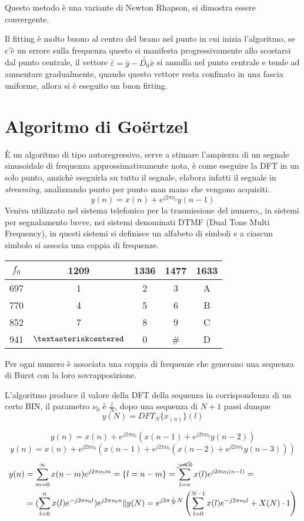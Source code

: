 Questo metodo è una variante di Newton Rhapson, si dimostra essere convergente.



Il fitting è molto buono al centro del brano nel punto in cui inizia
l'algoritmo, se c'è un errore sulla frequenza questo si manifesta
progressivamente allo scostarsi dal punto centrale, il vettore
$\bar{\varepsilon} = \bar{y} - \bar{\bar{D_0}}\bar{x}$ si annulla nel punto
centrale e tende ad aumentare gradualmente, quando questo vettore resta
confinato in una fascia uniforme, allora si è eseguito un buon fitting.

\section{Algoritmo di Goërtzel}
È un algoritmo di tipo autoregressivo, serve a stimare l'ampiezza di un segnale
sinusoidale di frequenza approssimativamente nota, è come eseguire la DFT in un
solo punto, anzichè eseguirla su tutto il segnale, elabora infatti il segnale
in \textit{streaming}, analizzando punto per punto man mano che vengono
acquisiti.
$$
y(n) = x(n) + e^{j2\pi \nu_0} y(n-1)
$$
Veniva utilizzato nel sistema telefonico per la trasmissione del numero,, in
sistemi per segnalamento breve, nei sistemi denominati DTMF (Dual Tone Multi
Frequency), in questi sistemi si definisce un alfabeto di simboli e a ciascun
simbolo si associa una coppia di frequenze.
\begin{table}[h]\centering
\begin{tabular}{c | c | c| c| c}
 $f_0$ &1209 &1336 & 1477 &1633 \\ \hline
 697 & 1 & 2 & 3 & A \\ \hline
 770 & 4 & 5 & 6 & B \\ \hline
 852 & 7 & 8 & 9 & C \\ \hline
 941 & $\textasteriskcentered$ & 0 & \# & D \\ \hline
\end{tabular}
\end{table}
Per ogni numero è associata una coppia di frequenze che generano una sequenza
di Burst con la loro sovrapposizione.

L'algoritmo produce il valore della DFT della sequenza in corrispondenza di un
certo BIN, il parametro $\nu_0$ è $\frac{l}{N}$, dopo una sequenza di $N+1$
passi dunque
$$
y(N) = DFT_N\{x_(n)\}(l)
$$

$$
y(n)  = x(n) + e^{j2\pi \nu_0} (x(n-1) + e^{j2\pi\nu_0}y(n-2))
$$
$$
y(n) = x(n) + e^{j2\pi\nu_0}(x(n-1)+e^{j2\pi\nu_0}
(x(n-2)+e^{j2\pi\nu_0}y(n-3)))
$$
$$\begin{aligned}
y(n) &= \sum_{m=0}^{\infty}x(n-m)e^{j2\pi\nu_0 m} = \{l = n-m\} =
\sum_{l=n}^{\cancel{-\infty}0}x(l)e^{j2\pi\nu_0(n-l)} = \\
&=(\sum_{l=0}^{n} x(l)e^{-j2\pi\nu_0 l})e^{j2\pi\nu_0 n} \| y(N) =
e^{j2\pi\frac{l}{N}N}\left( \sum_{l=0}^{N-1} x(l) e^{-j2\pi\nu_0 l} + X(N)\cdot
1 \right)
\end{aligned}$$

